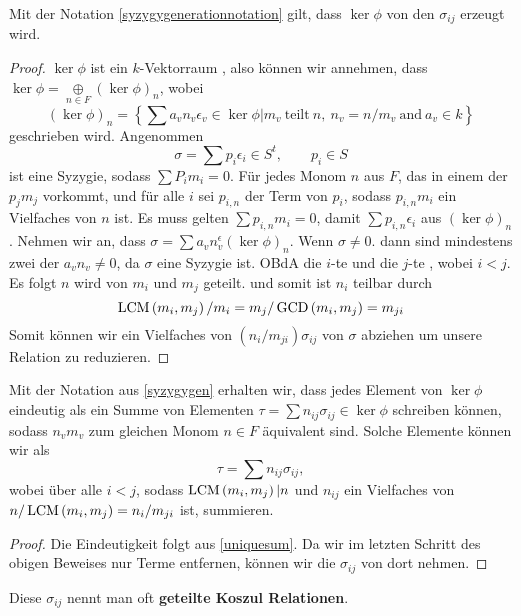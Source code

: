 \documentclass{article}
\begin{document}
	\begin{lem}
		Mit der Notation  \ref{syzygygenerationnotation} gilt,
		dass 
		\( \ker \phi \)
		von den
		\( \sigma_{ij} \)
		erzeugt wird.
		\begin{proof}
			\label{uniquesum}
			\( \ker \phi\)
			ist ein 
			\( k \)-Vektorraum ,
			also k\"onnen wir annehmen, dass 
			\( \ker \phi = \underset{n \in F }{\oplus}\left( \ker \phi \right)_{n}  \),
			wobei
			\[ 
				\left( \ker \phi \right)_{n} 
				= \left\{ 
					\sum a_{v} n_{v} \epsilon_{v} \in \ker \phi 
					\big| m_{v} \ \text{teilt} \  n, 
					\ n_{v} = n \slash m_{v} 
					\ \text{and} \ a_{v} \in k  
				\right\}
			\]
			geschrieben wird.
			Angenommen
			\[
				\sigma = \sum p_{i} \epsilon_{i} \in S^{t}, \qquad p_{i} \in S
			\]
			ist eine Syzygie,
			sodass
			\( \sum P_{i}m_{i} =0 \).
			F\"ur jedes Monom 
			\( n \)
			aus 
			\(F\),
			das in einem der 
			\( p_{j}m_{j} \)
			vorkommt,
			und f\"ur alle 
			\(i\) 
			sei 
			\( p_{i,n}\)
			der Term von
			\( p_{i} \),
			sodass 
			\( p_{i,n}m_{i} \)
			ein Vielfaches von 
			\( n\)
			ist.
			Es muss gelten
			\( \sum p_{i,n} m_{i}=0 \),
			damit 
			\( \sum p_{i,n} \epsilon_{i} \)
			aus 
			\( \left( \ker \phi \right)_{n}\).
			Nehmen wir an, dass 
			\( \sigma= \sum a_{v} n_{v}^{\epsilon} 
			\left( \ker \phi \right)_{n} \).
			Wenn 
			\( \sigma \neq 0 \).
			dann sind mindestens zwei der 
			\( a_{v} n_{v} \neq 0 \),
			da 
			\( \sigma \) eine Syzygie ist.
			OBdA die 
			\(i\)-te 
			und die
			\(j\)-te
			, wobei 
			\( i<j \).
			Es folgt 
			\( n \) 
			wird von
			\( m_{i} \)
			und 
			\( m_{j} \) 
			geteilt.
			und somit ist 
			\( n_{i} \)
			teilbar durch
			\[
				\operatorname{LCM}\left( m_{i},m_{j} \right)/m_{i} 
				= m_{j} / \operatorname{GCD}\left( m_{i},m_{j} \right) 
				= m_{ji} 
			\]
			Somit k\"onnen wir ein Vielfaches von 
			\( \left( n_{i}/m_{ji} \right)\sigma_{ij} \)
			von 
			\( \sigma \) 
			abziehen um unsere Relation zu reduzieren.
		\end{proof}
	\end{lem}
	\begin{lem}
		Mit der Notation aus \ref{syzygygen} erhalten wir,
		dass jedes Element von 
		\( \ker \phi \)
		eindeutig als ein Summe von Elementen 
		\( \tau = \sum n_{ij} \sigma_{ij} \in \ker \phi\)
		schreiben k\"onnen, 
		sodass 
		\( n_{v} m_{v} \)
		zum gleichen Monom 
		\( n\in F \)
		\"aquivalent sind.
		Solche Elemente k\"onnen wir als
		\[ 
			\tau = \sum n_{ij} \sigma_{ij} ,
		\]
		wobei \"uber alle 
		\( i<j \), 
		sodass 
		\( \operatorname{LCM} \left( m_{i},m_{j} \right)  | n \)
		und
		\( n_{ij} \)
		ein Vielfaches von 
		\( n/ \operatorname{LCM}\left( m_{i},m_{j} \right)
		=n_{i} / m_{ji}\)
		ist,
		summieren.
		\begin{proof}
			Die Eindeutigkeit folgt aus \ref{uniquesum}.
			Da wir im letzten Schritt des obigen Beweises nur Terme entfernen,
			k\"onnen wir die 
			\(\sigma_{ij} \) 
			von dort nehmen.
		\end{proof}
	\end{lem}
	Diese 
	\( \sigma_{ij}\)
	nennt man oft 
	\textbf{geteilte Koszul Relationen}.
\end{document}

